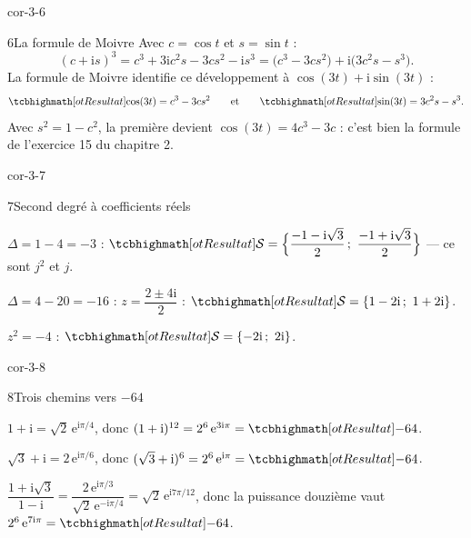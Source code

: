 \begin{blocLivre}{cor-3-6}
\begin{corrige}{6}{La formule de Moivre}
Avec $c=\cos t$ et $s=\sin t$ :
\[
  (c+\mathrm{i}s)^{3}=c^{3}+3\mathrm{i}c^{2}s-3cs^{2}-\mathrm{i}s^{3}
  =\bigl(c^{3}-3cs^{2}\bigr)+\mathrm{i}\bigl(3c^{2}s-s^{3}\bigr).
\]
La formule de Moivre identifie ce développement à $\cos(3t)+\mathrm{i}\sin(3t)$ :
\[
  \res{\cos(3t)=c^{3}-3cs^{2}}\qquad\text{et}\qquad\res{\sin(3t)=3c^{2}s-s^{3}}.
\]
Avec $s^{2}=1-c^{2}$, la première devient $\cos(3t)=4c^{3}-3c$ : c'est bien
la formule de l'exercice 15 du chapitre 2.
\end{corrige}
\end{blocLivre}

\begin{blocLivre}{cor-3-7}
\begin{corrige}{7}{Second degré à coefficients réels}
\begin{questions}
  \item $\Delta=1-4=-3$ :
    $\res{\mathcal{S}=\Bigl\{\dfrac{-1-\mathrm{i}\sqrt3}{2}\,;\ \dfrac{-1+\mathrm{i}\sqrt3}{2}\Bigr\}}$
    — ce sont $j^{2}$ et $j$.
  \item $\Delta=4-20=-16$ : $z=\dfrac{2\pm4\mathrm{i}}{2}$ :
    $\res{\mathcal{S}=\ens{1-2\mathrm{i}\,;\ 1+2\mathrm{i}}}$.
  \item $z^{2}=-4$ : $\res{\mathcal{S}=\ens{-2\mathrm{i}\,;\ 2\mathrm{i}}}$.
\end{questions}
\end{corrige}
\end{blocLivre}

\begin{blocLivre}{cor-3-8}
\begin{corrige}{8}{Trois chemins vers $-64$}
\begin{questions}
  \item $1+\mathrm{i}=\sqrt2\,\mathrm{e}^{\mathrm{i}\pi/4}$, donc
    $(1+\mathrm{i})^{12}=2^{6}\,\mathrm{e}^{3\mathrm{i}\pi}=\res{-64}$.
  \item $\sqrt3+\mathrm{i}=2\,\mathrm{e}^{\mathrm{i}\pi/6}$, donc
    $(\sqrt3+\mathrm{i})^{6}=2^{6}\,\mathrm{e}^{\mathrm{i}\pi}=\res{-64}$.
  \item $\dfrac{1+\mathrm{i}\sqrt3}{1-\mathrm{i}}
    =\dfrac{2\,\mathrm{e}^{\mathrm{i}\pi/3}}{\sqrt2\,\mathrm{e}^{-\mathrm{i}\pi/4}}
    =\sqrt2\,\mathrm{e}^{\mathrm{i}7\pi/12}$, donc la puissance douzième vaut
    $2^{6}\,\mathrm{e}^{7\mathrm{i}\pi}=\res{-64}$.
\end{questions}
\end{corrige}
\end{blocLivre}

